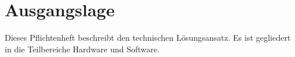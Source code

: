 %
%
%
\section{Ausgangslage}
Dieses Pflichtenheft beschreibt den technischen Lösungsansatz. Es ist gegliedert in die Teilbereiche Hardware und Software. 
%
